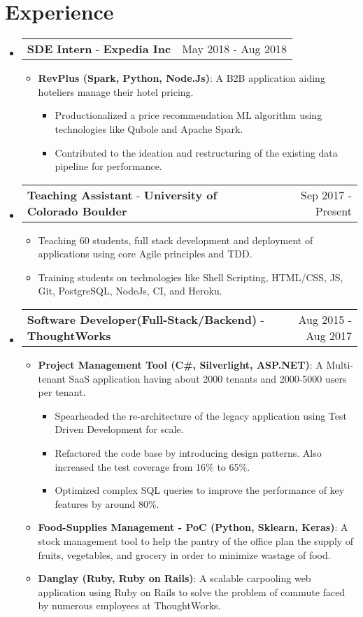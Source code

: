 \documentclass[letterpaper,11pt]{article}
\makeatletter
\newcommand{\resumeItem}[2]{
  \linespread{1.1}
	\item\small{
    	\textbf{#1}{: #2}
  	}
}
\newcommand{\resumePoint}[1]{
	\linespread{1.2}
	\item\small{#1}
}
\newcommand{\resumeExperienceSubheading}[5]{
    \vspace{-3pt}\item
    \begin{tabular*}{0.97\textwidth}{l@{\extracolsep{\fill}}r}
      \textbf{#1} \normalfont{\small#2} - \textbf{#3}\normalfont{#4} & #5 \\
    \end{tabular*}\vspace{-4pt}
}
\newcommand{\resumeSubHeadingListStart}{\begin{itemize}[leftmargin=*]}
\newcommand{\resumeSubHeadingListEnd}{\end{itemize}\vspace{-14pt}}
\newcommand{\resumeItemListStart}{\begin{itemize}}
\newcommand{\resumeItemListEnd}{\end{itemize}\vspace{-2pt}}
\newcommand{\resumeInnerItemListStart}{\begin{itemize}\vspace{-1pt}}
\newcommand{\resumeInnerItemListEnd}{\end{itemize}\vspace{2pt}}
\makeatother
\begin{document}
\section{Experience}
  \resumeSubHeadingListStart
  \resumeExperienceSubheading
      {SDE Intern}{(Data Engineering)}{Expedia Inc}{, Chicago, USA}{May 2018 - Aug 2018}
      \resumeItemListStart
          \resumeItem {RevPlus (Spark, Python, Node.Js)}
          {A B2B application aiding hoteliers manage their hotel pricing.}
          \resumeInnerItemListStart
            \resumePoint{Productionalized a price recommendation ML algorithm using technologies like Qubole and Apache Spark.}
            \resumePoint{Contributed to the ideation and restructuring of the existing data pipeline for performance.}
          \resumeInnerItemListEnd
      \resumeItemListEnd
    \vspace{-5pt}
    \resumeExperienceSubheading
      {Teaching Assistant}{\href{https://www.colorado.edu/cs/csci-3308-software-development-methods-and-tools}{(S/W Dev Methods \& Tools)}}{University of Colorado Boulder}{}{Sep 2017 - Present}
      \resumeItemListStart
          \resumePoint{Teaching 60 students, full stack development and deployment of applications using core Agile principles and TDD.}
          \resumePoint{Training students on technologies like Shell Scripting, HTML/CSS, JS, Git, PostgreSQL, NodeJs, CI, and Heroku.}
      \resumeItemListEnd
    \resumeExperienceSubheading
      {Software Developer(Full-Stack/Backend)}{}{ThoughtWorks}{, Bangalore, India}{Aug 2015 - Aug 2017}
      \resumeItemListStart
      \resumeItem {Project Management Tool (C\#, Silverlight, ASP.NET)}
          {A Multi-tenant SaaS application having about 2000 tenants and 2000-5000 users per tenant.}
          \resumeInnerItemListStart
            \resumePoint {Spearheaded the re-architecture of the legacy application using Test Driven Development for scale.}
            \resumePoint {Refactored the code base by introducing design patterns. Also increased the test coverage from 16\% to 65\%.}
            \resumePoint {Optimized complex SQL queries to improve the performance of key features by around 80\%.}
          \resumeInnerItemListEnd
        \resumeItem {Food-Supplies Management - PoC (Python, Sklearn, Keras)}{A stock management tool to help the pantry of the office plan the supply of fruits, vegetables, and grocery in order to minimize wastage of food.}
      \resumeItem {Danglay (Ruby, Ruby on Rails)}{A scalable carpooling web application using Ruby on Rails to solve the problem of commute faced by numerous employees at ThoughtWorks.}
      \resumeItemListEnd
  \resumeSubHeadingListEnd
\end{document}

